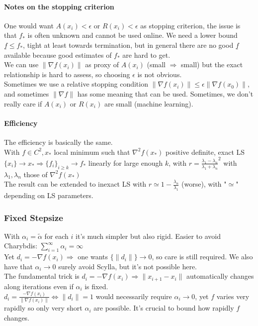 \documentclass[10pt]{report}
\begin{document}
\paragraph{Notes on the stopping criterion} One would want $A(x_i)<\epsilon$ or $R(x_i) < \epsilon$ as stopping criterion, the issue is that $f_*$ is often unknown and cannot be used online. We need a lower bound $\underline{f} \leq f_*$, tight at least towards termination, but in general there are no good $\underline{f}$ available because good estimates of $f_*$ are hard to get.\\
We can use $\|\nabla f(x_i)\|$ as proxy of $A(x_i)$ (small $\Rightarrow$ small) but the exact relationship is hard to assess, so choosing $\epsilon$ is not obvious.\\
Sometimes we use a relative stopping condition $\|\nabla f(x_i)\|\leq \epsilon\|\nabla f(x_0)\|$, and sometimes $\|\nabla f\|$ has some meaning that can be used. Sometimes, we don't really care if $A(x_i)$ or $R(x_i)$ are small (machine learning).
\paragraph{Efficiency} The efficiency is basically the same.\\
With $f\in C^2, x_*$ local minimum such that $\nabla^2f(x_*)$ positive definite, exact LS $\{x_i\}\rightarrow x_* \Rightarrow \{f_i\}_{i\geq k}\rightarrow f_*$ linearly for large enough $k$, with $r = \frac{\lambda_1 - \lambda_n}{\lambda_1 + \lambda_n}^2$ with $\lambda_1,\lambda_n$ those of $\nabla^2 f(x_*)$\\
The result can be extended to inexact LS with $r\simeq 1-\frac{\lambda_n}{\lambda_1}$ (worse), with "$\simeq$" depending on LS parameters.
\subsubsection{Fixed Stepsize}
With $\alpha_i = \tilde{\alpha}$ for each $i$ it's much simpler but also rigid. Easier to avoid Charybdis: $\sum_{i=1}^\infty \alpha_i = \infty$\\
Yet $d_i = -\nabla f(x_i) \Rightarrow$ one wants $\{\|d_i\|\}\rightarrow 0$, so care is still required. We also have that $\alpha_i\rightarrow 0$ surely avoid Scylla, but it's not possible here.\\
The fundamental trick is $d_i = -\nabla f(x_i) \Rightarrow \|x_{i+1} - x_i\|$ automatically changes along iterations even if $\alpha_i$ is fixed.\\
$d_i = \frac{-\nabla f(x_i)}{\|\nabla f(x_i)\|} \Leftrightarrow \|d_i\| = 1$ would necessarily require $\alpha_i \rightarrow 0$, yet $f$ varies very rapidly so only very short $\alpha_i$ are possible. It's crucial to bound how rapidly $f$ changes.
\end{document}
